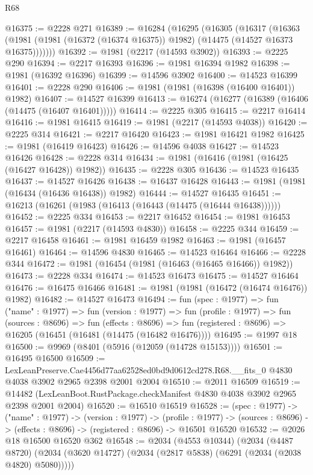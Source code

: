 \begin{lexlean}{R68}
\begin{coremodule}
@16375 := @2228 @271
@16389 := @16284
    (@16295
      (@16305
        (@16317
          (@16363 (@1981 (@1981 (@16372 (@16374 @16375)) @1982) (@14475 (@14527 @16373 @16375)))))))
@16392 := @1981 (@2217 (@14593 @3902))
@16393 := @2225 @290
@16394 := @2217 @16393
@16396 := @1981 @16394 @1982
@16398 := @1981 (@16392 @16396)
@16399 := @14596 @3902
@16400 := @14523 @16399
@16401 := @2228 @290
@16406 := @1981 (@1981 (@16398 (@16400 @16401)) @1982)
@16407 := @14527 @16399
@16413 := @16274 (@16277 (@16389 (@16406 (@14475 (@16407 @16401)))))
@16414 := @2225 @305
@16415 := @2217 @16414
@16416 := @1981 @16415
@16419 := @1981 (@2217 (@14593 @4038))
@16420 := @2225 @314
@16421 := @2217 @16420
@16423 := @1981 @16421 @1982
@16425 := @1981 (@16419 @16423)
@16426 := @14596 @4038
@16427 := @14523 @16426
@16428 := @2228 @314
@16434 := @1981 (@16416 (@1981 (@16425 (@16427 @16428)) @1982))
@16435 := @2228 @305
@16436 := @14523 @16435
@16437 := @14527 @16426
@16438 := @16437 @16428
@16443 := @1981 (@1981 (@16434 (@16436 @16438)) @1982)
@16444 := @14527 @16435
@16451 := @16213 (@16261 (@1983 (@16413 (@16443 (@14475 (@16444 @16438))))))
@16452 := @2225 @334
@16453 := @2217 @16452
@16454 := @1981 @16453
@16457 := @1981 (@2217 (@14593 @4830))
@16458 := @2225 @344
@16459 := @2217 @16458
@16461 := @1981 @16459 @1982
@16463 := @1981 (@16457 @16461)
@16464 := @14596 @4830
@16465 := @14523 @16464
@16466 := @2228 @344
@16472 := @1981 (@16454 (@1981 (@16463 (@16465 @16466)) @1982))
@16473 := @2228 @334
@16474 := @14523 @16473
@16475 := @14527 @16464
@16476 := @16475 @16466
@16481 := @1981 (@1981 (@16472 (@16474 @16476)) @1982)
@16482 := @14527 @16473
@16494 := fun (spec : @1977) =>
  fun ("name" : @1977) =>
  fun (version : @1977) =>
  fun (profile : @1977) =>
  fun (sources : @8696) =>
  fun (effects : @8696) =>
  fun (registered : @8696) => @16205 (@16451 (@16481 (@14475 (@16482 @16476))))
@16495 := @1997 @18
@16500 := @9969 (@8401 (@5916 (@12059 (@14728 @15153))))
@16501 := @16495 @16500
@16509 := LexLeanPreserve.Cae4456d77aa62528ed0bd9d0612cd278.R68.__fits_0
    @4830
    @4038
    @3902
    @2965
    @2398
    @2001
    @2004
@16510 := @2011 @16509
@16519 := @14482 (LexLeanBoot.RustPackage.checkManifest @4830 @4038 @3902 @2965 @2398 @2001 @2004)
@16520 := @16510 @16519
@16528 := (spec : @1977) ->
  ("name" : @1977) ->
  (version : @1977) ->
  (profile : @1977) ->
  (sources : @8696) -> (effects : @8696) -> (registered : @8696) -> @16501 @16520
@16532 := @2026 @18 @16500 @16520 @362
@16548 := @2034
    (@4553 @10344)
    (@2034
      (@4487 @8720)
      (@2034 (@3620 @14727) (@2034 (@2817 @5838) (@6291 (@2034 (@2038 @4820) @5080)))))

\end{coremodule}
\end{lexlean}

